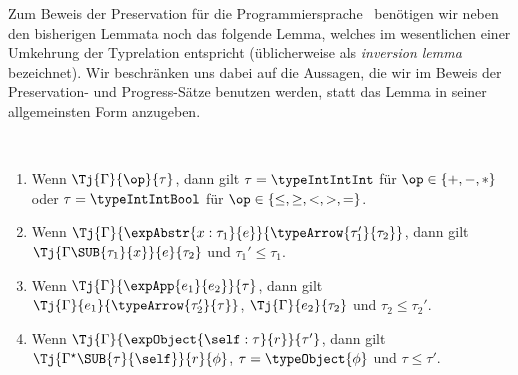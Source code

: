 Zum Beweis der Preservation f\"ur die Programmiersprache \Losub\ ben\"otigen wir neben den bisherigen
Lemmata noch das folgende Lemma, welches im wesentlichen einer Umkehrung der Typrelation entspricht
(\"ublicherweise als {\em inversion lemma} bezeichnet).
Wir beschr\"anken uns dabei auf die Aussagen, die wir im Beweis
der Preservation- und Progress-S\"atze benutzen werden, statt das Lemma in seiner allgemeinsten Form
anzugeben.

\begin{lemma} \label{lemma:Losub:Umkehrung_der_Typrelation} \
  \begin{enumerate}
    \item Wenn $\Tj{\Gamma}{\op}{\tau}$, dann gilt $\tau=\typeIntIntInt$ f\"ur $\op\in\{+,-,*\}$
          oder $\tau=\typeIntIntBool$ f\"ur $\op\in\{\le,\ge,<,>,=\}$.
    \item Wenn $\Tj{\Gamma}{\expAbstr{x:\tau_1}{e}}{\typeArrow{\tau_1'}{\tau_2}}$, dann gilt
          $\Tj{\Gamma\SUB{\tau_1}{x}}{e}{\tau_2}$ und $\tau_1' \le \tau_1$.
    \item Wenn $\Tj{\Gamma}{\expApp{e_1}{e_2}}{\tau}$, dann gilt $\Tj{\Gamma}{e_1}{\typeArrow{\tau_2'}{\tau}}$,
          $\Tj{\Gamma}{e_2}{\tau_2}$ und $\tau_2 \le \tau_2'$.
    \item Wenn $\Tj{\Gamma}{\expObject{\self:\tau}{r}}{\tau'}$, dann gilt
          $\Tj{\Gamma^\star\SUB{\tau}{\self}}{r}{\phi}$, $\tau = \typeObject{\phi}$ und $\tau \le \tau'$.
  \end{enumerate}
\end{lemma}

